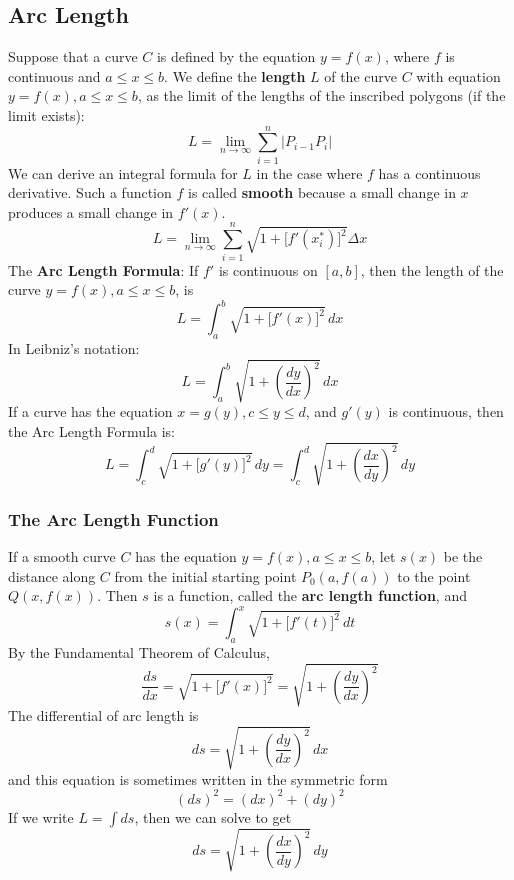 \subsection{Arc Length}

Suppose that a curve \(C\) is defined by the equation \(y=f(x)\), where \(f\)
is continuous and \(a\leq x\leq b\).
We define the \textbf{length} \(L\) of the curve \(C\) with equation
\(y=f(x),a\leq x\leq b\), as the limit of the lengths of the inscribed
polygons (if the limit exists):
\[L=\lim_{n\to\infty}\sum_{i=1}^n |P_{i-1}P_i|\]
We can derive an integral formula for \(L\) in the case where \(f\) has a
continuous derivative.
Such a function \(f\) is called \textbf{smooth} because a small change in
\(x\) produces a small change in \(f'(x)\).
\[L=\lim_{n\to\infty}\sum_{i=1}^n\sqrt{1+\big[f'(x_i^*)\big]^2}\Delta x\]
The \textbf{Arc Length Formula}: If \(f'\) is continuous on \([a,b]\), then
the length of the curve \(y=f(x),a\leq x\leq b\), is
\[L=\int_a^b\sqrt{1+\big[f'(x)\big]^2}\,dx\]
In Leibniz's notation:
\[L=\int_a^b\sqrt{1+\left(\frac{dy}{dx}\right)^2}\,dx\]
If a curve has the equation \(x=g(y),c\leq y\leq d\), and \(g'(y)\) is
continuous, then the Arc Length Formula is:
\[L=\int_c^d\sqrt{1+\big[g'(y)\big]^2}\,dy
=\int_c^d\sqrt{1+\left(\frac{dx}{dy}\right)^2}\,dy\]

\subsubsection*{The Arc Length Function}
If a smooth curve \(C\) has the equation \(y=f(x),a\leq x\leq b\), let
\(s(x)\) be the distance along \(C\) from the initial starting point
\(P_0(a,f(a))\) to the point \(Q(x,f(x))\).
Then \(s\) is a function, called the \textbf{arc length function}, and
\[s(x)=\int_a^x\sqrt{1+\big[f'(t)\big]^2}\,dt\]
By the Fundamental Theorem of Calculus,
\[\frac{ds}{dx}=\sqrt{1+\big[f'(x)\big]^2}
=\sqrt{1+\left(\frac{dy}{dx}\right)^2}\]
The differential of arc length is
\[ds=\sqrt{1+\left(\frac{dy}{dx}\right)^2}\,dx\]
and this equation is sometimes written in the symmetric form
\[(ds)^2=(dx)^2+(dy)^2\]
If we write \(\displaystyle{L=\int ds}\), then we can solve to get
\[ds=\sqrt{1+\left(\frac{dx}{dy}\right)^2}\,dy\]